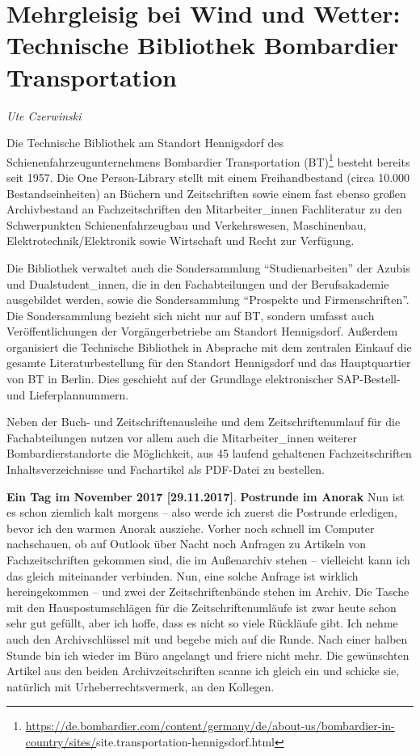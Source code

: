 \documentclass[a4paper,
fontsize=11pt,
oneside,
numbers=noperiodatend,
parskip=half-,
bibliography=totoc,
final
]{scrartcl}
\begin{document}
\newpage

\hypertarget{mehrgleisig-bei-wind-und-wetter-technische-bibliothek-bombardier-transportation}{%
\section{Mehrgleisig bei Wind und Wetter: Technische Bibliothek
Bombardier
Transportation}\label{mehrgleisig-bei-wind-und-wetter-technische-bibliothek-bombardier-transportation}}

\emph{Ute Czerwinski}

Die Technische Bibliothek am Standort Hennigsdorf des
Schienenfahrzeugunternehmens Bombardier Transportation (BT)\footnote{\url{https://de.bombardier.com/content/germany/de/about-us/bombardier-in-country/sites/}site.transportation-hennigsdorf.html}
besteht bereits seit 1957. Die One Person-Library stellt mit einem
Freihandbestand (circa 10.000 Bestandseinheiten) an Büchern und
Zeitschriften sowie einem fast ebenso großen Archivbestand an
Fachzeitschriften den Mitarbeiter\_innen Fachliteratur zu den
Schwerpunkten Schienenfahrzeugbau und Verkehrswesen, Maschinenbau,
Elektrotechnik/Elektronik sowie Wirtschaft und Recht zur Verfügung.

Die Bibliothek verwaltet auch die Sondersammlung
\enquote{Studienarbeiten} der Azubis und Dualstudent\_innen, die in den
Fachabteilungen und der Berufsakademie ausgebildet werden, sowie die
Sondersammlung \enquote{Prospekte und Firmenschriften}. Die
Sondersammlung bezieht sich nicht nur auf BT, sondern umfasst auch
Veröffentlichungen der Vorgängerbetriebe am Standort Hennigsdorf.
Außerdem organisiert die Technische Bibliothek in Absprache mit dem
zentralen Einkauf die gesamte Literaturbestellung für den Standort
Hennigsdorf und das Hauptquartier von BT in Berlin. Dies geschieht auf
der Grundlage elektronischer SAP-Bestell- und Lieferplannummern.

Neben der Buch- und Zeitschriftenausleihe und dem Zeitschriftenumlauf
für die Fachabteilungen nutzen vor allem auch die Mitarbeiter\_innen
weiterer Bombardierstandorte die Möglichkeit, aus 45 laufend gehaltenen
Fachzeitschriften Inhaltsverzeichnisse und Fachartikel als PDF-Datei zu
bestellen.

\textbf{Ein Tag im November 2017 {[}29.11.2017{]}}. \textbf{Postrunde im
Anorak} Nun ist es schon ziemlich kalt morgens -- also werde ich zuerst
die Postrunde erledigen, bevor ich den warmen Anorak ausziehe. Vorher
noch schnell im Computer nachschauen, ob auf Outlook über Nacht noch
Anfragen zu Artikeln von Fachzeitschriften gekommen sind, die im
Außenarchiv stehen -- vielleicht kann ich das gleich miteinander
verbinden. Nun, eine solche Anfrage ist wirklich hereingekommen -- und
zwei der Zeitschriftenbände stehen im Archiv. Die Tasche mit den
Hauspostumschlägen für die Zeitschriftenumläufe ist zwar heute schon
sehr gut gefüllt, aber ich hoffe, dass es nicht so viele Rückläufe gibt.
Ich nehme auch den Archivschlüssel mit und begebe mich auf die Runde.
Nach einer halben Stunde bin ich wieder im Büro angelangt und friere
nicht mehr. Die gewünschten Artikel aus den beiden Archivzeitschriften
scanne ich gleich ein und schicke sie, natürlich mit
Urheberrechtsvermerk, an den Kollegen.
\end{document}
